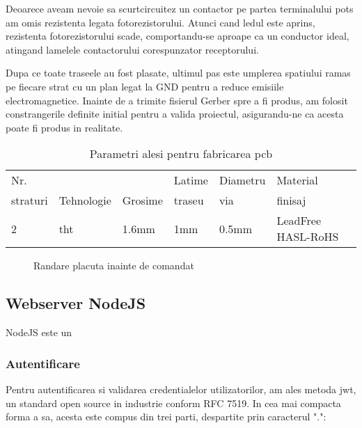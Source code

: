 Deoarece aveam nevoie sa scurtcircuitez un contactor pe partea terminalului \acrshort{pots} am omis rezistenta legata fotorezistorului. Atunci cand ledul este aprins, rezistenta fotorezistorului scade, comportandu-se aproape ca un conductor ideal, atingand lamelele contactorului corespunzator receptorului.

Dupa ce toate traseele au fost plasate, ultimul pas este umplerea spatiului ramas pe fiecare strat cu un plan legat la GND pentru a reduce emisiile electromagnetice. Inainte de a trimite fisierul Gerber spre a fi produs, am folosit constrangerile definite initial pentru a valida proiectul, asigurandu-ne ca acesta poate fi produs in realitate.

\begin{table}[ht!]
\begin{tabular}{llllll}
\hline
Nr. &  &  & Latime & Diametru & Material \\ 
straturi & Tehnologie & Grosime & traseu & via & finisaj \\
\hline
\hline
2 & \acrshort{tht} & 1.6mm & 1mm & 0.5mm & LeadFree HASL-RoHS\\
\hline
\end{tabular}
\centering
\caption{Parametri alesi pentru fabricarea \acrshort{pcb}}
\label{tab:params}
\end{table}

\begin{figure}[!ht]
\begin{center}
  \caption{Randare placuta inainte de comandat}
  \label{fig:hat}
\end{center}
\end{figure}

\subsection {Webserver NodeJS}

NodeJS este un

\subsubsection {Autentificare}

Pentru autentificarea si validarea credentialelor utilizatorilor, am ales metoda \acrfull{jwt}, un standard open source in industrie conform RFC 7519. In cea mai compacta forma a sa, acesta este compus din trei parti, despartite prin caracterul ".":

